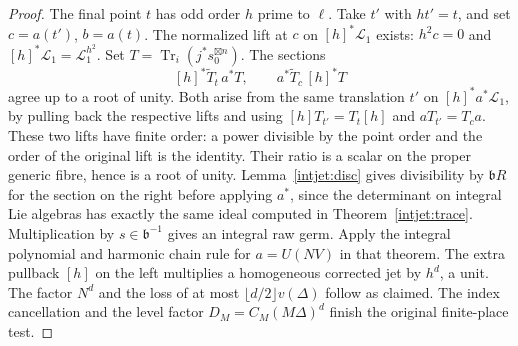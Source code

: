\begin{proof}
The final point \(t\) has odd order \(h\) prime to \(\ell\).
Take \(t'\) with \(ht'=t\), and set \(c=a(t')\), \(b=a(t)\).
The normalized lift at \(c\) on \([h]^*\mathcal L_1\) exists:
\(h^2c=0\) and \([h]^*\mathcal L_1=\mathcal L_1^{h^2}\).
Set \(T=\operatorname{Tr}_i(j^*s_0^{\boxtimes n})\).
The sections
\[
       [h]^*\widetilde T_t\,a^*T,\qquad
           a^*\widetilde T_c\,[h]^*T
\]
agree up to a root of unity. Both arise from the same translation
\(t'\) on \([h]^*a^*\mathcal L_1\), by pulling back the respective
lifts and using \([h]T_{t'}=T_t[h]\) and \(aT_{t'}=T_ca\).
These two lifts have finite order: a power divisible by the point
order and the order of the original lift is the identity. Their
ratio is a scalar on the proper generic fibre, hence is a root
of unity. Lemma~\ref{intjet:disc} gives divisibility by
\(\mathfrak b R\) for the section on the right before applying
\(a^*\), since the determinant on integral Lie algebras has
exactly the same ideal computed in Theorem~\ref{intjet:trace}.
Multiplication by \(s\in\mathfrak b^{-1}\) gives an integral raw
germ. Apply the integral polynomial and harmonic chain rule for
\(a=U(NV)\) in that theorem. The extra pullback \([h]\) on the
left multiplies a homogeneous corrected jet by \(h^d\), a unit.
The factor \(N^d\) and the loss of at most
\(\lfloor d/2\rfloor v(\Delta)\) follow as claimed. The index
cancellation and the level factor \(D_M=C_M(M\Delta)^d\) finish
the original finite-place test.
\end{proof}
